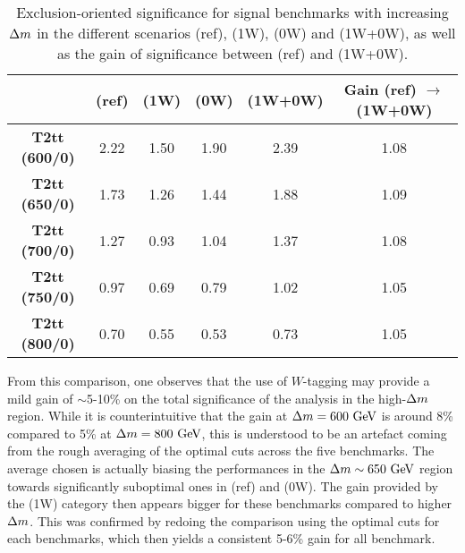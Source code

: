     \begin{table}
        \centering
        \begin{tabular}{c|c|cc|c|c}
                                   & (ref)             & (1W)                         & (0W)                   & (1W+0W) & Gain (ref) $\rightarrow$ (1W+0W)\\
            \hline
            \textbf{T2tt (600/0)}  & 2.22              & 1.50                         & 1.90                   & 2.39    & 1.08 \\
            \textbf{T2tt (650/0)}  & 1.73              & 1.26                         & 1.44                   & 1.88    & 1.09 \\
            \textbf{T2tt (700/0)}  & 1.27              & 0.93                         & 1.04                   & 1.37    & 1.08 \\
            \textbf{T2tt (750/0)}  & 0.97              & 0.69                         & 0.79                   & 1.02    & 1.05 \\
            \textbf{T2tt (800/0)}  & 0.70              & 0.55                         & 0.53                   & 0.73    & 1.05
        \end{tabular}
        \caption{Exclusion-oriented significance for signal benchmarks with increasing
        $\Delta m$ in the different scenarios (ref), (1W), (0W) and (1W+0W),
        as well as the gain of significance between (ref) and (1W+0W).}
        \label{tab:wTaggingSignificanceGain}
    \end{table}

    From this comparison, one observes that the use of $W$-tagging may provide a mild gain of
    $\sim$5-10\% on the total significance of the analysis in the high-$\Delta m$ region.
    While it is counterintuitive that the gain at $\Delta m = 600~\text{GeV}$ is around 8\%
    compared to 5\% at $\Delta m = 800~\text{GeV}$, this is understood to be an artefact coming
    from the rough averaging of the optimal cuts across the five benchmarks. The average
    chosen is actually biasing the performances in the $\Delta m \sim 650~\text{GeV}$ region
    towards significantly suboptimal ones in (ref) and (0W). The gain provided by the
    (1W) category then appears bigger for these benchmarks compared to higher $\Delta m$.
    This was confirmed by redoing the comparison using the optimal cuts for
    each benchmarks, which then yields a consistent 5-6\% gain for all benchmark.

